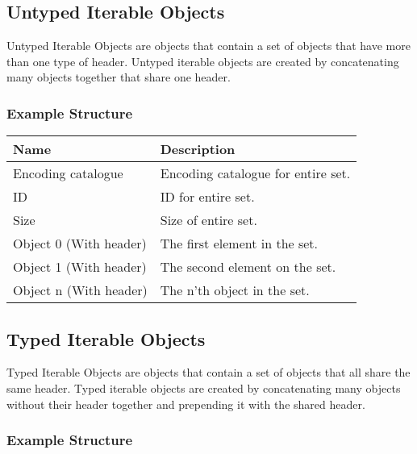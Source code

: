 \documentclass[11pt]{article}
\begin{document}
\subsection{Untyped Iterable Objects}
Untyped Iterable Objects are objects that contain a set of objects that have more than one type of header. Untyped iterable objects are created by concatenating many objects together that share one header.

\subsubsection{Example Structure}

\begin{center}
  \begin{tabular}{ |l|l| }
    \hline
    \textbf{Name}          & \textbf{Description}               \\
    \hline
    Encoding catalogue     & Encoding catalogue for entire set. \\
    ID                     & ID for entire set.                 \\
    Size                   & Size of entire set.                \\
    Object 0 (With header) & The first element in the set.      \\
    Object 1 (With header) & The second element on the set.     \\
    Object n (With header) & The n'th object in the set.        \\
    \hline
  \end{tabular}
\end{center}

\subsection{Typed Iterable Objects}
Typed Iterable Objects are objects that contain a set of objects that all share the same header. Typed iterable objects are created by concatenating many objects without their header together and prepending it with the shared header.

\subsubsection{Example Structure}
\end{document}
